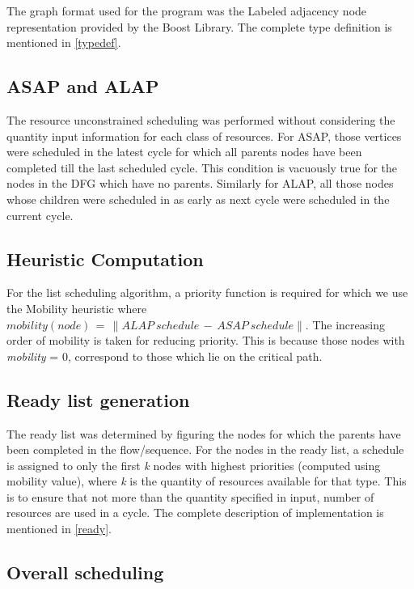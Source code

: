 \documentclass[letterpaper, 10 pt, conference]{ieeeconf}  %
\begin{document}
The graph format used for the program was the Labeled adjacency node representation provided by the Boost Library. The complete type definition is mentioned in \ref{typedef}.

\subsection{ASAP and ALAP}

The resource unconstrained scheduling was performed without considering the quantity input information for each class of resources. For ASAP, those vertices were scheduled in the latest cycle for which all parents nodes have been completed till the last scheduled cycle. This condition is vacuously true for the nodes in the DFG which have no parents. Similarly for ALAP, all those nodes whose children were scheduled in as early as next cycle were scheduled in the current cycle.

\subsection{Heuristic Computation}

For the list scheduling algorithm, a priority function is required for which we use the Mobility heuristic where $mobility(node) \, = \, \|ALAP \ schedule \,-\, ASAP\ schedule\|$. The increasing order of mobility is taken for reducing priority. This is because those nodes with \textit{mobility} = 0, correspond to those which lie on the critical path. 

\subsection{Ready list generation}

The ready list was determined by figuring the nodes for which the parents have been completed in the flow/sequence. For the nodes in the ready list, a schedule is assigned to only the first \textit{k} nodes with highest priorities (computed using mobility value), where \textit{k} is the quantity of resources available for that type. This is to ensure that not more than the quantity specified in input, number of resources are used in a cycle. The complete description of implementation is mentioned in \ref{ready}.

\subsection{Overall scheduling}
\end{document}
